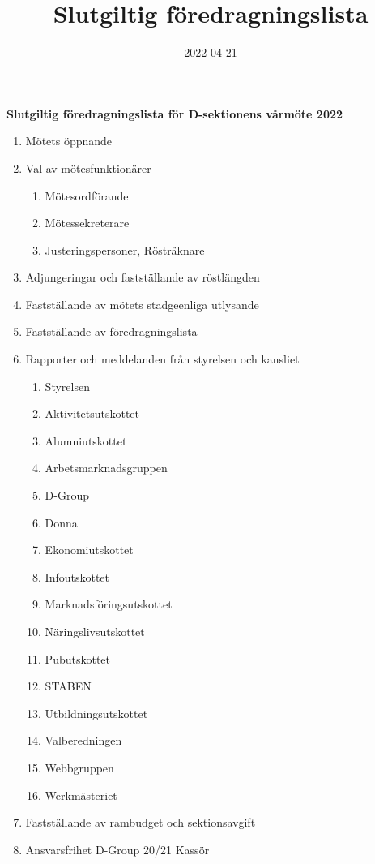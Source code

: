 \documentclass{datateknologsektionen-document}
\title{Slutgiltig föredragningslista}
\date{2022-04-21}
\begin{document}
\large
\begin{center}
  {\LARGE\bfseries Slutgiltig föredragningslista för D-sektionens vårmöte 2022}
  \vspace{2mm}
\end{center}

\Large
\begin{enumerate}[topsep=0pt,itemsep=1ex]
  \item Mötets öppnande
  \item Val av mötesfunktionärer
        \begin{enumerate}[label*=\arabic*.,leftmargin=3em]
          \item Mötesordförande
          \item Mötessekreterare
          \item Justeringspersoner, Rösträknare
        \end{enumerate}
  \item Adjungeringar och fastställande av röstlängden
  \item Fastställande av mötets stadgeenliga utlysande
  \item Fastställande av föredragningslista
  \item Rapporter och meddelanden från styrelsen och kansliet
  \begin{enumerate}[label*=\arabic*.,leftmargin=3em]
    \item Styrelsen
    \item Aktivitetsutskottet
    \item Alumniutskottet
    \item Arbetsmarknadsgruppen
    \item D-Group
    \item Donna
    \item Ekonomiutskottet
    \item Infoutskottet
    \item Marknadsföringsutskottet
    \item Näringslivsutskottet
    \item Pubutskottet
    \item STABEN
    \item Utbildningsutskottet
    \item Valberedningen
    \item Webbgruppen
    \item Werkmästeriet
  \end{enumerate}
  \item Fastställande av rambudget och sektionsavgift
  \item Ansvarsfrihet D-Group 20/21 Kassör

\end{enumerate}
\end{document}
